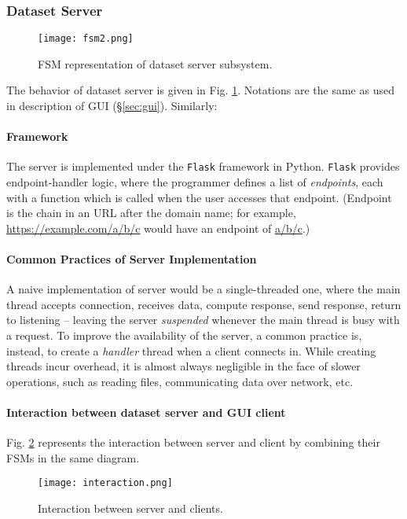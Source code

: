 \subsubsection{Dataset Server}

\begin{figure}
    \centering
    \texttt{[image: fsm2.png]}
    \caption{FSM representation of dataset server subsystem.}
    \label{fig:fsm_server}
\end{figure}

The behavior of dataset server is given in Fig. \ref{fig:fsm_server}. Notations
are the same as used in description of GUI (\S\ref{sec:gui}). Similarly:

\paragraph{Framework} The server is implemented under the \texttt{Flask}
framework in Python. \texttt{Flask} provides endpoint-handler logic, where the
programmer defines a list of \textit{endpoints}, each with a function which is
called when the user accesses that endpoint. (Endpoint is the chain in an URL
after the domain name; for example, \url{https://example.com/a/b/c} would have
an endpoint of \url{a/b/c}.)

\paragraph{Common Practices of Server Implementation} A naive implementation of
server would be a single-threaded one, where the main thread accepts
connection, receives data, compute response, send response, return to listening
-- leaving the server \textit{suspended} whenever the main thread is busy with
a request. To improve the availability of the server, a common practice is,
instead, to create a \textit{handler} thread when a client connects in. While
creating threads incur overhead, it is almost always negligible in the face of
slower operations, such as reading files, communicating data over network, etc.

\paragraph{Interaction between dataset server and GUI client} Fig.
\ref{fig:interaction} represents the interaction between server and client by
combining their FSMs in the same diagram.

\begin{figure}
    \centering
    \texttt{[image: interaction.png]}
    \caption{Interaction between server and clients.}
    \label{fig:interaction}
\end{figure}

